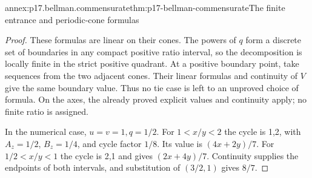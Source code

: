 \begin{annexitem}{annex:p17.bellman.commensurate}{thm:p17-bellman-commensurate}{The finite entrance and periodic-cone formulas}
\begin{proof}
These formulas are linear
on their cones. The powers
of \(q\) form a discrete
set of boundaries in any
compact positive ratio interval,
so the decomposition is
locally finite in the strict
positive quadrant.
At a positive boundary point,
take sequences from the two
adjacent cones. Their linear
formulas and continuity of
\(V\) give the same boundary
value. Thus no tie case is
left to an unproved choice
of formula. On the axes,
the already proved explicit
values and continuity apply;
no finite ratio is assigned.

In the numerical case,
\(u=v=1,q=1/2\).
For \(1<x/y<2\) the cycle
is 1,2, with \(A_z=1/2\),
\(B_z=1/4\), and cycle
factor \(1/8\).
Its value is \((4x+2y)/7\).
For \(1/2<x/y<1\) the
cycle is 2,1 and gives
\((2x+4y)/7\).
Continuity supplies the
endpoints of both intervals,
and substitution of \((3/2,1)\)
gives \(8/7\).
\end{proof}
\end{annexitem}

